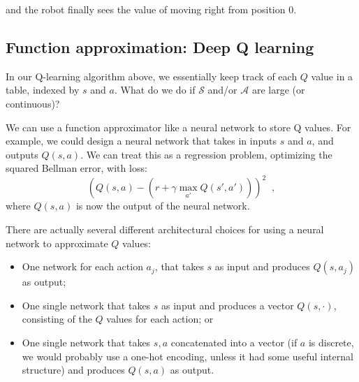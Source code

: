 and the robot finally sees the value of moving right from position 0.


\subsection{Function approximation: Deep Q learning}
In our Q-learning algorithm above, we essentially keep track of each
$Q$ value in a table, indexed by $s$ and $a$. What do we do if
$\mathcal{S}$ and/or $\mathcal{A}$ are large (or continuous)?

We can use a function approximator like a neural network to store Q
values. For example, we could design a neural network that takes in
inputs $s$ and $a$, and outputs $Q(s,a)$. We can treat this as a
regression problem, optimizing the squared Bellman error, with loss:
\begin{equation}
\left(Q(s,a) - (r + \gamma \max_{a'}Q(s',a'))\right)^2\;\;,
\end{equation}
where $Q(s, a)$ is now the output  of the neural network.

There are actually several different architectural choices for using a
neural network to approximate $Q$ values:
\begin{itemize}
\item One network for each action $a_j$, that takes $s$ as input and
  produces $Q(s,  a_j)$ as output;
\item One single network that takes $s$ as input and produces a vector
  $Q(s, \cdot)$, consisting of the $Q$ values for each action; or
\item One single network that takes $s, a$ concatenated into a vector
  (if $a$ is discrete,  we would probably use a one-hot encoding,
  unless it had some useful internal structure) and produces $Q(s, a)$
  as output.
\end{itemize}


